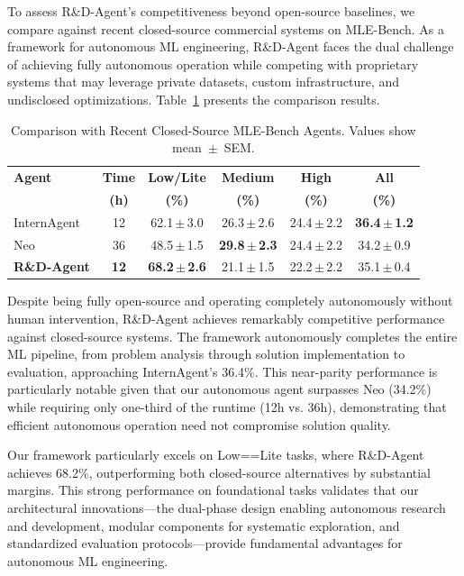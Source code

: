 To assess R\&D-Agent's competitiveness beyond open-source baselines, we compare against recent closed-source commercial systems on MLE-Bench. As a framework for autonomous ML engineering, R\&D-Agent faces the dual challenge of achieving fully autonomous operation while competing with proprietary systems that may leverage private datasets, custom infrastructure, and undisclosed optimizations. Table~\ref{tab:closed_source_comparison} presents the comparison results.

\begin{table}[htbp]
\centering
\caption{Comparison with Recent Closed-Source MLE-Bench Agents. Values show mean \,$\pm$\, SEM.}
\label{tab:closed_source_comparison}
\renewcommand{\arraystretch}{1.2}
\setlength{\tabcolsep}{5pt}
\begin{tabular}{lccccc}
\toprule
\textbf{Agent} & \textbf{Time} & \textbf{Low/Lite} & \textbf{Medium} & \textbf{High} & \textbf{All} \\
& \textbf{(h)} & \textbf{(\%)} & \textbf{(\%)} & \textbf{(\%)} & \textbf{(\%)} \\
\midrule
InternAgent~\citep{team2025novelseek} & 12 & 62.1\,$\pm$\,3.0 & 26.3\,$\pm$\,2.6 & 24.4\,$\pm$\,2.2 & \textbf{36.4\,$\pm$\,1.2} \\
Neo~\citep{neo2025} & 36 & 48.5\,$\pm$\,1.5 & \textbf{29.8\,$\pm$\,2.3} & 24.4\,$\pm$\,2.2 & 34.2\,$\pm$\,0.9 \\
\textbf{R\&D-Agent} & \textbf{12} & \textbf{68.2\,$\pm$\,2.6} & 21.1\,$\pm$\,1.5 & 22.2\,$\pm$\,2.2 & 35.1\,$\pm$\,0.4 \\
\bottomrule
\end{tabular}
\end{table}

Despite being fully open-source and operating completely autonomously without human intervention, R\&D-Agent achieves remarkably competitive performance against closed-source systems. The framework autonomously completes the entire ML pipeline, from problem analysis through solution implementation to evaluation, approaching InternAgent's 36.4\%. This near-parity performance is particularly notable given that our autonomous agent surpasses Neo (34.2\%) while requiring only one-third of the runtime (12h vs. 36h), demonstrating that efficient autonomous operation need not compromise solution quality.

Our framework particularly excels on Low==Lite tasks, where R\&D-Agent achieves 68.2\%, outperforming both closed-source alternatives by substantial margins. This strong performance on foundational tasks validates that our architectural innovations—the dual-phase design enabling autonomous research and development, modular components for systematic exploration, and standardized evaluation protocols—provide fundamental advantages for autonomous ML engineering.










